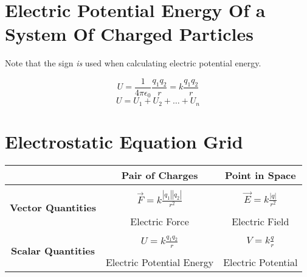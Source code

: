 \documentclass{article}
\begin{document}
    \section{Electric Potential Energy Of a System Of Charged Particles}
    
        Note that the sign \textit{is} used when calculating electric potential energy.

        \begin{equation}
            U = \frac{1}{4\pi\epsilon_0} \frac{q_1 q_2}{r} = k \frac{q_1 q_2}{r}
        \end{equation}
        \begin{equation}
            U = U_1 + U_2 + \ldots + U_n
        \end{equation}

    \section*{Electrostatic Equation Grid}

        \begin{center}
        \begin{tabular}{|c|c|c|}
            \hline                                      & \textbf{Pair of Charges}                  & \textbf{Point in Space} \\\hline
            \multirow{4}{*}{\textbf{Vector Quantities}} &                                           & \\
                                                        & \(\displaystyle\vec{F} = k \frac{\left|q_1\right|\left|q_2\right|}{r^2}\) & \(\displaystyle\vec{E} = k \frac{\left|q\right|}{r^2}\) \\
                                                        &                                           & \\
                                                        & Electric Force                            & Electric Field \\\hline
            \multirow{4}{*}{\textbf{Scalar Quantities}} &                                           & \\
                                                        & \(\displaystyle U = k \frac{q_1 q_2}{r}\) & \(\displaystyle V = k \frac{q}{r}\) \\
                                                        &                                           & \\
                                                        & Electric Potential Energy                 & Electric Potential \\\hline
        \end{tabular}
        \end{center}
\end{document}
